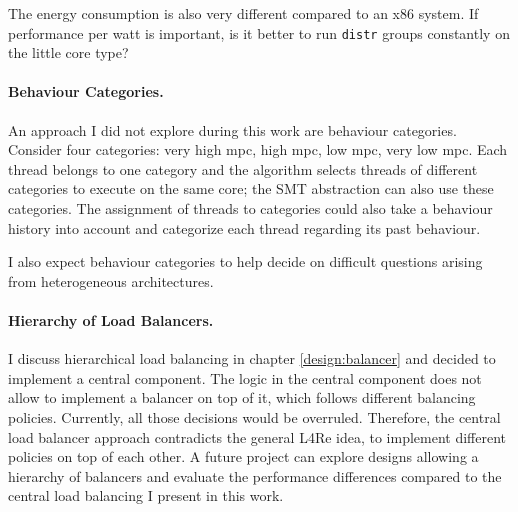 The energy consumption is also very different compared to an x86 system.
If performance per watt is important, is it better to run \texttt{distr} groups
constantly on the little core type?


\paragraph{Behaviour Categories.}
An approach I did not explore during this work are behaviour categories.
Consider four categories: very high \gls{mpc}, high \gls{mpc}, low \gls{mpc},
very low \gls{mpc}.
Each thread belongs to one category and the algorithm selects threads of
different categories to execute on the same core; the SMT abstraction can also
use these categories.
The assignment of threads to categories could also take a behaviour history
into account and categorize each thread regarding its past behaviour.

I also expect behaviour categories to help decide on difficult questions
arising from heterogeneous architectures.

\paragraph{Hierarchy of Load Balancers.}
I discuss hierarchical load balancing in chapter \ref{design:balancer} and
decided to implement a central component.
The logic in the central component does not allow to implement a
balancer on top of it, which follows different balancing policies.
Currently, all those decisions would be overruled.
Therefore, the central load balancer approach contradicts the general L4Re
idea, to implement different policies on top of each other.
A future project can explore designs allowing a hierarchy of balancers and
evaluate the performance differences compared to the central load balancing I
present in this work.

\begin{comment}
\paragraph{Workload-Aware Balancing.}
The modular approach allows quick replacement and testing of different
algorithms in the various components.
If very specific workloads run on the system, tuned balancing algorithms for
this specific workload can be used to increase the performance of the system.
\end{comment}


\cleardoublepage

